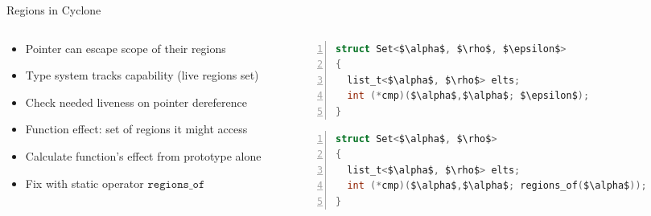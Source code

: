 \documentclass[aspectratio=169]{beamer}
\begin{document}
\begin{frame}[fragile]{Regions in Cyclone}
\footnotesize

  \begin{columns}[T]
    \begin{column}{0.52\textwidth}
      \begin{itemize}[<+->]
        \item Pointer can escape scope of their regions 
        \item Type system tracks \alert{capability} (live regions set)
        \item Check needed \alert{liveness} on pointer dereference %
        \item Function \alert{effect}: set of regions it might access
        \item Calculate function's effect from prototype alone
        \item Fix with static operator $\texttt{regions\_of}$ %
      \end{itemize}
    \end{column}

\begin{column}{0.46\textwidth}

    \pause

\begin{lstlisting}[language=C,numbers=left,mathescape,basicstyle={\footnotesize\ttfamily}]
struct Set<$\alpha$, $\rho$, $\epsilon$>
{
  list_t<$\alpha$, $\rho$> elts;
  int (*cmp)($\alpha$,$\alpha$; $\epsilon$);
}
\end{lstlisting}

\pause

\begin{lstlisting}[language=C,numbers=left,mathescape,basicstyle={\footnotesize\ttfamily}]
struct Set<$\alpha$, $\rho$>
{
  list_t<$\alpha$, $\rho$> elts;
  int (*cmp)($\alpha$,$\alpha$; regions_of($\alpha$));
}
\end{lstlisting}

\end{column}
\end{columns}

\end{frame}
\end{document}
